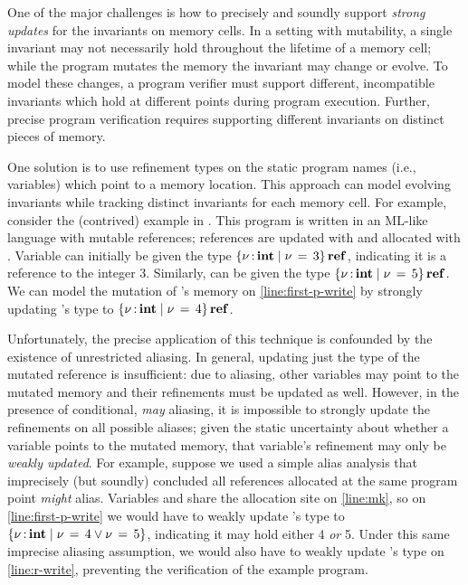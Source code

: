 One of the major challenges is how to precisely and soundly support
\emph{strong updates} for the invariants on memory cells.
In a setting with mutability, a single invariant may not necessarily
hold throughout the lifetime of a memory cell; while the program
mutates the memory the invariant may change or evolve.
To model these changes, a program verifier
must support different, incompatible invariants which hold at
different points during program execution. Further, precise
program verification requires supporting different invariants
on distinct pieces of memory.

One solution is to use refinement types on the static program names
(i.e., variables) which point to a memory location.
This approach can model evolving invariants
while tracking distinct invariants for each memory cell.
For example,
consider the (contrived) example in .
This program is written in an ML-like language with mutable references;
references are updated with \imp{:=} and allocated with .
Variable  can initially be given the type
$ \left\{{  \nu  \operatorname{:} \mathbf{int} \mid  \nu \, = \, 3 }\right\} \operatorname{\mathbf{ref}}$, indicating it is a
reference to the integer 3.
Similarly,  can be given the type $ \left\{{  \nu  \operatorname{:} \mathbf{int} \mid  \nu \, = \, 5 }\right\}  \operatorname{\mathbf{ref}}$.
We can model the mutation of 's memory on \cref{line:first-p-write}
by strongly updating 's type to $ \left\{{  \nu  \operatorname{:} \mathbf{int} \mid  \nu \, = \, 4 }\right\}  \operatorname{\mathbf{ref}}$.

Unfortunately, the precise application of this technique is confounded
by the existence of unrestricted aliasing.
In general, updating just the type of the mutated reference
is insufficient: due to aliasing, other variables may point to the mutated
memory and their refinements must be updated as well. However,
in the presence of conditional, \emph{may} aliasing, it is
impossible to strongly update the refinements on all possible
aliases; given the static uncertainty
about whether a variable points to the mutated memory, that variable's
refinement may only be \emph{weakly updated}. For example,
suppose we used a simple alias analysis that imprecisely (but soundly)
concluded all references allocated at the same program point \emph{might} alias.
Variables  and  share the allocation site on
\cref{line:mk}, so on \cref{line:first-p-write} we would have to weakly update
's type to $ \left\{{  \nu  \operatorname{:} \mathbf{int} \mid  \nu \, = \, 4  \vee  \nu \, = \, 5 }\right\} $,
indicating it may hold either 4 \emph{or} 5.
Under this same imprecise aliasing assumption,
we would also have to weakly update
's type on \cref{line:r-write},
preventing the verification of the example program.

